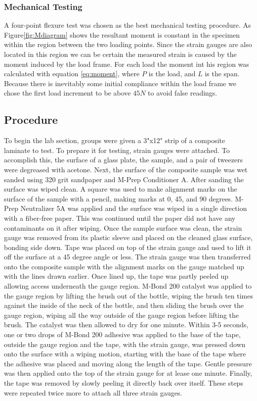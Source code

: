 \documentclass[12pt]{article}
\begin{document}
\subsubsection{Mechanical Testing}
A four-point flexure test was chosen as  the best mechanical testing procedure.   As Figure\ref{fig:Mdiagram}  shows the resultant moment is constant in the specimen within the region between the two loading points.  Since the strain gauges are also located in this region we can be certain the measured strain is caused by the moment induced by the load frame. For each load the moment int his region  was calculated with equation \ref{eq:moment}, where $P$ is the load, and $L$ is the span.  Because there is inevitably some initial compliance within the load frame  we chose the first load increment to be above $45N$ to avoid false readings.  

\subsection{Procedure} %

To begin the lab section, groups were given a 3"x12" strip of a composite laminate to test. To prepare it for testing, strain gauges were attached. To accomplish this, the surface of a glass plate, the sample, and a pair of tweezers were degreased with acetone. Next, the surface of the composite sample was wet sanded using 320 grit sandpaper and M-Prep Conditioner A. After sanding the surface was wiped clean. A square was used to make alignment marks on the surface of the sample with a pencil, making marks at 0, 45, and 90 degrees. M-Prep Neutralizer 5A was applied and the surface was wiped in a single direction with a fiber-free paper. This was continued until the paper did not have any contaminants on it after wiping. Once the sample surface was clean, the strain gauge was removed from its plastic sleeve and placed on the cleaned glass surface, bonding side down. Tape was placed on top of the strain gauge and used to lift it off the surface at a 45 degree angle or less. The strain gauge was then transferred onto the composite sample with the alignment marks on the gauge matched up with the lines drawn earlier. Once lined up, the tape was partly peeled up allowing access underneath the gauge region. M-Bond 200 catalyst was applied to the gauge region by lifting the brush out of the bottle, wiping the brush ten times against the inside of the neck of the bottle, and then sliding the brush over the gauge region, wiping all the way outside of the gauge region before lifting the brush. The catalyst was then allowed to dry for one minute. Within 3-5 seconds, one or two drops of M-Bond 200 adhesive was applied to the base of the tape, outside the gauge region and the tape, with the strain gauge, was pressed down onto the surface with a wiping motion, starting with the base of the tape where the adhesive was placed and moving along the length of the tape. Gentle pressure was then applied onto the top of the strain gauge for at lease one minute. Finally, the tape was removed by slowly peeling it directly back over itself. These steps were repeated twice more to attach all three strain gauges.
\end{document}
